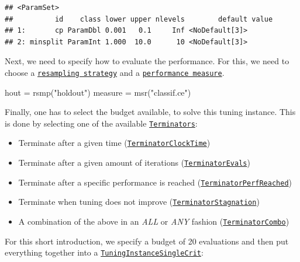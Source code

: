 \documentclass[
]{scrbook}
\newenvironment{Shaded}{\begin{snugshade}}{\end{snugshade}}
\newcommand{\FunctionTok}[1]{\textcolor[rgb]{0.00,0.00,0.00}{#1}}
\newcommand{\NormalTok}[1]{#1}
\newcommand{\OtherTok}[1]{\textcolor[rgb]{0.56,0.35,0.01}{#1}}
\newcommand{\StringTok}[1]{\textcolor[rgb]{0.31,0.60,0.02}{#1}}
\providecommand{\tightlist}{%
  \setlength{\itemsep}{0pt}\setlength{\parskip}{0pt}}
\renewenvironment{Shaded} {\begin{snugshade}\small} {\end{snugshade}}
\begin{document}
\begin{verbatim}
## <ParamSet>
##          id    class lower upper nlevels        default value
## 1:       cp ParamDbl 0.001   0.1     Inf <NoDefault[3]>      
## 2: minsplit ParamInt 1.000  10.0      10 <NoDefault[3]>
\end{verbatim}

Next, we need to specify how to evaluate the performance.
For this, we need to choose a \href{https://mlr3.mlr-org.com/reference/Resampling.html}{\texttt{resampling\ strategy}} and a \href{https://mlr3.mlr-org.com/reference/Measure.html}{\texttt{performance\ measure}}.

\begin{Shaded}
\begin{Highlighting}[]
\NormalTok{hout }\OtherTok{=} \FunctionTok{rsmp}\NormalTok{(}\StringTok{"holdout"}\NormalTok{)}
\NormalTok{measure }\OtherTok{=} \FunctionTok{msr}\NormalTok{(}\StringTok{"classif.ce"}\NormalTok{)}
\end{Highlighting}
\end{Shaded}

Finally, one has to select the budget available, to solve this tuning instance.
This is done by selecting one of the available \href{https://bbotk.mlr-org.com/reference/Terminator.html}{\texttt{Terminators}}:

\begin{itemize}
\tightlist
\item
  Terminate after a given time (\href{https://bbotk.mlr-org.com/reference/mlr_terminators_clock_time.html}{\texttt{TerminatorClockTime}})
\item
  Terminate after a given amount of iterations (\href{https://bbotk.mlr-org.com/reference/mlr_terminators_evals.html}{\texttt{TerminatorEvals}})
\item
  Terminate after a specific performance is reached (\href{https://bbotk.mlr-org.com/reference/mlr_terminators_perf_reached.html}{\texttt{TerminatorPerfReached}})
\item
  Terminate when tuning does not improve (\href{https://bbotk.mlr-org.com/reference/mlr_terminators_stagnation.html}{\texttt{TerminatorStagnation}})
\item
  A combination of the above in an \emph{ALL} or \emph{ANY} fashion (\href{https://bbotk.mlr-org.com/reference/mlr_terminators_combo.html}{\texttt{TerminatorCombo}})
\end{itemize}

For this short introduction, we specify a budget of 20 evaluations and then put everything together into a \href{https://mlr3tuning.mlr-org.com/reference/TuningInstanceSingleCrit.html}{\texttt{TuningInstanceSingleCrit}}:
\end{document}
